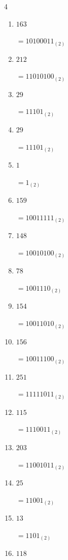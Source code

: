 \begin{multicols}{4}
\begin{enumerate}
        $=11100010_{(2)}$

  \item $163$

        $=10100011_{(2)}$

  \item $212$

        $=11010100_{(2)}$

  \item $29$

        $=11101_{(2)}$

  \item $29$

        $=11101_{(2)}$

  \item $1$

        $=1_{(2)}$

  \item $159$

        $=10011111_{(2)}$

  \item $148$

        $=10010100_{(2)}$

  \item $78$

        $=1001110_{(2)}$

  \item $154$

        $=10011010_{(2)}$

  \item $156$

        $=10011100_{(2)}$

  \item $251$

        $=11111011_{(2)}$

  \item $115$

        $=1110011_{(2)}$

  \item $203$

        $=11001011_{(2)}$

\columnbreak %

\resetques

  \item $25$

        $=11001_{(2)}$

  \item $13$

        $=1101_{(2)}$

  \item $118$


\end{enumerate}
\end{multicols}
